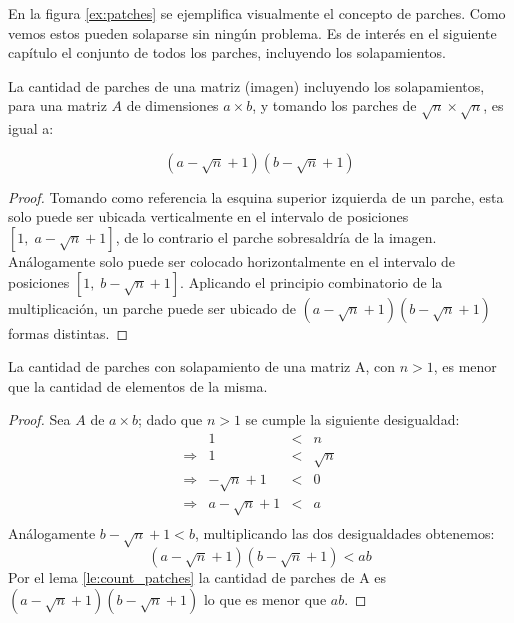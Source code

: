 En la figura \ref{ex:patches} se ejemplifica visualmente el concepto de parches. Como vemos estos pueden solaparse sin ning\'un problema. Es de inter\'es en el siguiente cap\'itulo el conjunto de todos los parches, incluyendo los solapamientos.
\begin{lemma}\label{le:count_patches}
	La cantidad de parches de una matriz (imagen) incluyendo los solapamientos, para una matriz $A$ de dimensiones $a \times b$, y tomando los parches de $\sqrt{n} \times \sqrt{n}$, es igual a:
	
	\begin{equation}
		(a - \sqrt{n} + 1)(b - \sqrt{n} + 1)
		\label{eq:count_patches}
	\end{equation}
\end{lemma}
\begin{proof}
	Tomando como referencia la esquina superior izquierda de un parche, esta solo puede ser ubicada verticalmente en el intervalo de posiciones $[1,\; a - \sqrt{n} + 1]$, de lo contrario el parche sobresaldr\'ia de la imagen. An\'alogamente solo puede ser colocado horizontalmente en el intervalo de posiciones $[1,\; b - \sqrt{n} + 1]$. Aplicando el principio combinatorio de la multiplicaci\'on, un parche puede ser ubicado de $(a - \sqrt{n} + 1)(b - \sqrt{n} + 1)$ formas distintas.
\end{proof}

\begin{lemma}\label{le:count_patches_ieq}
	La cantidad de parches con solapamiento de una matriz A, con $n > 1$, es menor que la cantidad de elementos de la misma.
\end{lemma}
\begin{proof}
	Sea $A$ de $a \times b$; dado que $n > 1$ se cumple la siguiente desigualdad:
	\begin{equation}
		\begin{array}{lrcl}
			                &               1 &<& n        \\ 
			\Longrightarrow &               1 &<& \sqrt{n} \\
			\Longrightarrow &   -\sqrt{n} + 1 &<& 0        \\
			\Longrightarrow & a -\sqrt{n} + 1 &<& a        \\
		\end{array}
	\end{equation}
	An\'alogamente $b -\sqrt{n} + 1 < b$, multiplicando las dos desigualdades obtenemos:
	\begin{equation}
		(a - \sqrt{n} + 1)(b - \sqrt{n} + 1) < ab
		\label{eq:count_patches_ieq}
	\end{equation}
	Por el lema \ref{le:count_patches} la cantidad de parches de A es $(a - \sqrt{n} + 1)(b - \sqrt{n} + 1)$ lo que es menor que $ab$.
\end{proof} 

